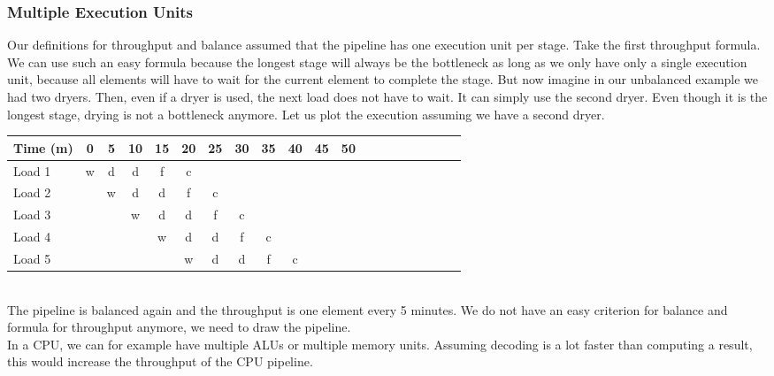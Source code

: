\documentclass[main.tex]{subfiles}
\begin{document}
\subsubsection{Multiple Execution Units}
Our definitions for throughput and balance assumed that the pipeline has one execution unit per stage. Take the first throughput formula. We can use such an easy formula because the longest stage will always be the bottleneck as long as we only have only a single execution unit, because all elements will have to wait for the current element to complete the stage. But now imagine in our unbalanced example we had two dryers. Then, even if a dryer is used, the next load does not have to wait. It can simply use the second dryer. Even though it is the longest stage, drying is not a bottleneck anymore. Let us plot the execution assuming we have a second dryer.\\[3mm]
\begin{tabular}{l | *{19}{c}}
    Time (m) & 0 & 5 & 10 & 15 & 20 & 25 & 30 & 35 & 40 & 45 & 50 \\
    \hline
    Load 1 & w & d & d & f & c\\
    Load 2 &   & w & d & d & f & c\\
    Load 3 &   &   & w &  d & d & f & c \\
    Load 4 &   &   &   & w & d & d & f & c \\
    Load 5 &   &   &   &   & w &  d & d & f & c
\end{tabular} \\[3mm]
The pipeline is balanced again and the throughput is one element every 5 minutes. We do not have an easy criterion for balance and formula for throughput anymore, we need to draw the pipeline.\\
In a CPU, we can for example have multiple ALUs or multiple memory units. Assuming decoding is a lot faster than computing a result, this would increase the throughput of the CPU pipeline.
\end{document}
